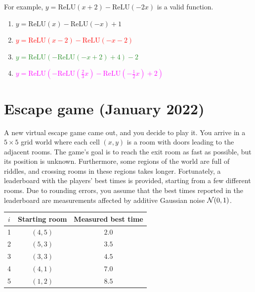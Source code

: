 \documentclass[11pt, a4paper]{article}
\def\ReLU{\mathrm{ReLU}}
\begin{document}
For example, $y = \ReLU(x + 2) - \ReLU(-2x)$ is a valid function.

\begin{solution}
    \begin{enumerate}
        \item \textcolor{NavyBlue}{$y = \ReLU(x) - \ReLU(-x) + 1$}
        \item \textcolor{Red}{$y = \ReLU(x - 2) - \ReLU(-x - 2)$}
        \item \textcolor{ForestGreen}{$y = \ReLU(-\ReLU(-x + 2) + 4) - 2$}
        \item \textcolor{Fuchsia}{$y = \ReLU(-\ReLU(\frac{2}{3} x) - \ReLU(-\frac{1}{2} x) + 2)$}
    \end{enumerate}
\end{solution}

\newpage

\section{Escape game (January 2022)}

A new virtual escape game came out, and you decide to play it. You arrive in a $5 \times 5$ grid world where each cell $(x, y)$ is a room with doors leading to the adjacent rooms. The game's goal is to reach the exit room as fast as possible, but its position is unknown. Furthermore, some regions of the world are full of riddles, and crossing rooms in these regions takes longer. Fortunately, a leaderboard with the players' best times is provided, starting from a few different rooms. Due to rounding errors, you assume that the best times reported in the leaderboard are measurements affected by additive Gaussian noise $\mathcal{N}(0, 1)$.

\begin{table}[h]
    \centering
    \begin{tabular}{c|cc}
        \toprule
        $i$ & Starting room & Measured best time \\
        \midrule
        1 & $(4, 5)$ & $2.0$ \\
        2 & $(5, 3)$ & $3.5$ \\
        3 & $(3, 3)$ & $4.5$ \\
        4 & $(4, 1)$ & $7.0$ \\
        5 & $(1, 2)$ & $8.5$ \\
        \bottomrule
    \end{tabular}
\end{table}
\end{document}
